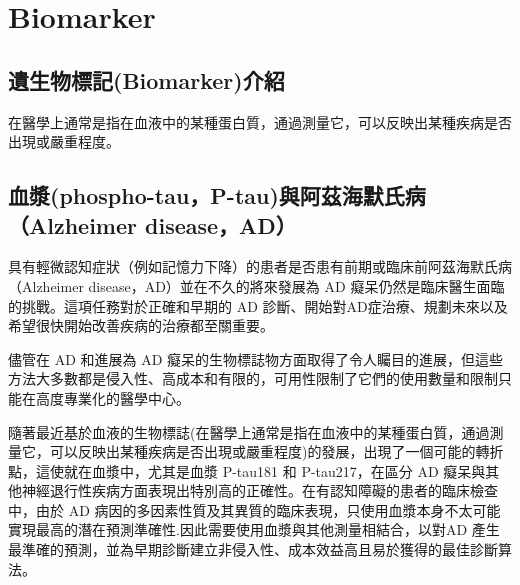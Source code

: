 \chapter{Biomarker}
\label{chapter:intro}
\section{遺生物標記(Biomarker)介紹}
在醫學上通常是指在血液中的某種蛋白質，通過測量它，可以反映出某種疾病是否出現或嚴重程度。


\label{sec:background}
\section{血漿(phospho-tau，P-tau)與阿茲海默氏病（Alzheimer disease，AD）}

具有輕微認知症狀（例如記憶力下降）的患者是否患有前期或臨床前阿茲海默氏病（Alzheimer disease，AD）並在不久的將來發展為 AD 癡呆仍然是臨床醫生面臨的挑戰。這項任務對於正確和早期的 AD 診斷、開始對AD症治療、規劃未來以及希望很快開始改善疾病的治療都至關重要。

儘管在 AD 和進展為 AD 癡呆的生物標誌物方面取得了令人矚目的進展，但這些方法大多數都是侵入性、高成本和有限的，可用性限制了它們的使用數量和限制只能在高度專業化的醫學中心。
 
隨著最近基於血液的生物標誌(在醫學上通常是指在血液中的某種蛋白質，通過測量它，可以反映出某種疾病是否出現或嚴重程度)的發展，出現了一個可能的轉折點，這使就在血漿中，尤其是血漿 P-tau181 和 P-tau217，在區分 AD 癡呆與其他神經退行性疾病方面表現出特別高的正確性。在有認知障礙的患者的臨床檢查中，由於 AD 病因的多因素性質及其異質的臨床表現，只使用血漿本身不太可能實現最高的潛在預測準確性.因此需要使用血漿與其他測量相結合，以對AD 產生最準確的預測，並為早期診斷建立非侵入性、成本效益高且易於獲得的最佳診斷算法。



